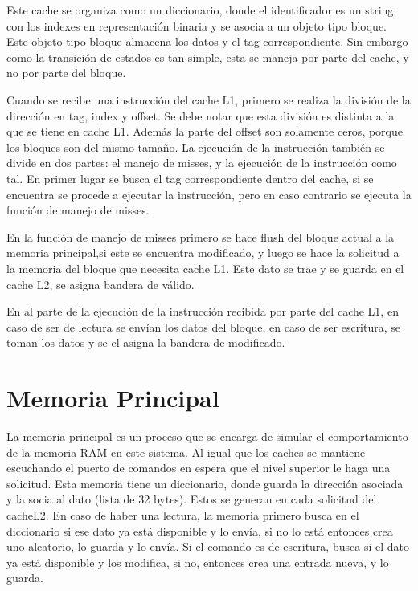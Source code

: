 \documentclass {article}
\begin{document}
Este cache se organiza como un diccionario, donde el identificador es un string con los indexes en
representación binaria y se asocia a un objeto tipo bloque. Este objeto tipo bloque almacena los
datos y el tag correspondiente. Sin embargo como la transición de estados es tan simple, esta se
maneja por parte del cache, y no por parte del bloque.

Cuando se recibe una instrucción del cache L1, primero se realiza la división de la dirección en
tag, index y offset. Se debe notar que esta división es distinta a la que se tiene en cache
L1. Además la parte del offset son solamente ceros, porque los bloques son del mismo tamaño. La
ejecución de la instrucción también se divide en dos partes: el manejo de misses, y la ejecución de
la instrucción como tal. En primer lugar se busca el tag correspondiente dentro del cache, si se
encuentra se procede a ejecutar la instrucción, pero en caso contrario se ejecuta la función de
manejo de misses.

En la función de manejo de misses primero se hace flush del bloque actual a la memoria principal,si
este se encuentra modificado, y
luego se hace la solicitud a la memoria del bloque que necesita cache L1. Este dato se trae y se
guarda en el cache L2, se asigna bandera de válido.

En al parte de la ejecución de la instrucción recibida por parte del cache L1, en caso de ser de
lectura se envían los datos del bloque, en caso de ser escritura, se toman los datos y se el asigna
la bandera de modificado.

\section{Memoria Principal}

La memoria principal es un proceso que se encarga de simular el comportamiento de la memoria RAM en
este sistema. Al igual que los caches se mantiene escuchando el puerto de comandos en espera que el
nivel superior le haga una solicitud. Esta memoria tiene un diccionario, donde guarda la dirección
asociada y la socia al dato (lista de 32 bytes).  Estos se generan en cada solicitud del cacheL2. En
caso de haber una lectura, la memoria primero busca en el diccionario si ese dato ya está
disponible y lo envía, si no lo está entonces crea uno aleatorio, lo guarda y lo envía. Si el
comando es de escritura, busca si el dato ya está disponible y los modifica, si no, entonces crea
una entrada nueva, y lo guarda.
\end{document}
